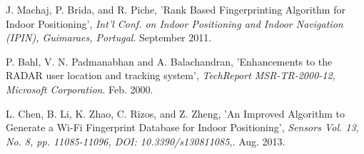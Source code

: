 \documentclass[conference]{IEEEtran}
\begin{document}
\begin{thebibliography}{99}
 J. Machaj, P. Brida, and R. Piche,
'Rank Based Fingerprinting Algorithm for Indoor Positioning',
\emph{Int'l Conf. on Indoor Positioning and Indoor Navigation (IPIN), Guimaraes, Portugal}. September 2011.

 P. Bahl, V. N. Padmanabhan and A. Balachandran,
'Enhancements to the RADAR user location and tracking system',
\emph{TechReport MSR-TR-2000-12, Microsoft Corporation}. Feb. 2000.

 L. Chen, B. Li, K. Zhao, C. Rizos, and Z. Zheng,
'An Improved Algorithm to Generate a Wi-Fi Fingerprint Database for Indoor Positioning',
\emph{Sensors Vol. 13, No. 8, pp. 11085-11096, DOI: 10.3390/s130811085,}. Aug. 2013.


\end{thebibliography}
\end{document}
